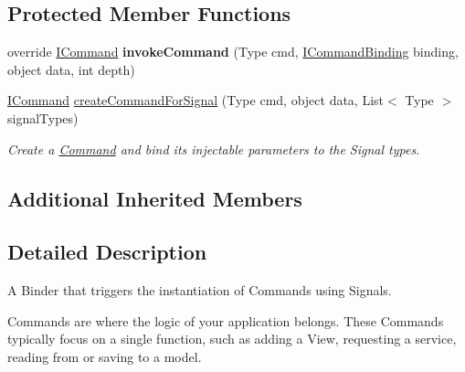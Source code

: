 \subsection*{Protected Member Functions}
\begin{DoxyCompactItemize}
\item 
\hypertarget{classstrange_1_1extensions_1_1command_1_1impl_1_1_signal_command_binder_ae50bae7a041628b864cd02f9d2019064}{override \hyperlink{interfacestrange_1_1extensions_1_1command_1_1api_1_1_i_command}{I\-Command} {\bfseries invoke\-Command} (Type cmd, \hyperlink{interfacestrange_1_1extensions_1_1command_1_1api_1_1_i_command_binding}{I\-Command\-Binding} binding, object data, int depth)}\label{classstrange_1_1extensions_1_1command_1_1impl_1_1_signal_command_binder_ae50bae7a041628b864cd02f9d2019064}

\item 
\hypertarget{classstrange_1_1extensions_1_1command_1_1impl_1_1_signal_command_binder_a457544c2c0a43b636ba8e6098b84a3d1}{\hyperlink{interfacestrange_1_1extensions_1_1command_1_1api_1_1_i_command}{I\-Command} \hyperlink{classstrange_1_1extensions_1_1command_1_1impl_1_1_signal_command_binder_a457544c2c0a43b636ba8e6098b84a3d1}{create\-Command\-For\-Signal} (Type cmd, object data, List$<$ Type $>$ signal\-Types)}\label{classstrange_1_1extensions_1_1command_1_1impl_1_1_signal_command_binder_a457544c2c0a43b636ba8e6098b84a3d1}

\begin{DoxyCompactList}\small\item\em Create a \hyperlink{classstrange_1_1extensions_1_1command_1_1impl_1_1_command}{Command} and bind its injectable parameters to the Signal types. \end{DoxyCompactList}\end{DoxyCompactItemize}
\subsection*{Additional Inherited Members}


\subsection{Detailed Description}
A Binder that triggers the instantiation of Commands using Signals. 

Commands are where the logic of your application belongs. These Commands typically focus on a single function, such as adding a View, requesting a service, reading from or saving to a model.

